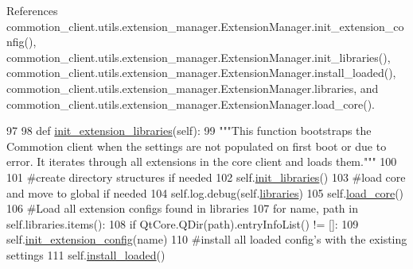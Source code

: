 References commotion\+\_\+client.\+utils.\+extension\+\_\+manager.\+Extension\+Manager.\+init\+\_\+extension\+\_\+config(), commotion\+\_\+client.\+utils.\+extension\+\_\+manager.\+Extension\+Manager.\+init\+\_\+libraries(), commotion\+\_\+client.\+utils.\+extension\+\_\+manager.\+Extension\+Manager.\+install\+\_\+loaded(), commotion\+\_\+client.\+utils.\+extension\+\_\+manager.\+Extension\+Manager.\+libraries, and commotion\+\_\+client.\+utils.\+extension\+\_\+manager.\+Extension\+Manager.\+load\+\_\+core().


\begin{DoxyCode}
97 
98     \textcolor{keyword}{def }\hyperlink{classcommotion__client_1_1utils_1_1extension__manager_1_1ExtensionManager_a5a94323a3528a6af3bf009eb302fa729}{init\_extension\_libraries}(self):
99         \textcolor{stringliteral}{"""This function bootstraps the Commotion client when the settings are not populated on first boot
       or due to error. It iterates through all extensions in the core client and loads them."""}
100         
101         \textcolor{comment}{#create directory structures if needed}
102         self.\hyperlink{classcommotion__client_1_1utils_1_1extension__manager_1_1ExtensionManager_a2edb9c39e0b8e5143c245089170182a3}{init\_libraries}()
103         \textcolor{comment}{#load core and move to global if needed}
104         self.log.debug(self.\hyperlink{classcommotion__client_1_1utils_1_1extension__manager_1_1ExtensionManager_a28e035496b4d544179f934b3c401c0c1}{libraries})
105         self.\hyperlink{classcommotion__client_1_1utils_1_1extension__manager_1_1ExtensionManager_a98f5f3c261f083885a9b0528dcdafd34}{load\_core}()
106         \textcolor{comment}{#Load all extension configs found in libraries}
107         \textcolor{keywordflow}{for} name, path \textcolor{keywordflow}{in} self.libraries.items():
108             \textcolor{keywordflow}{if} QtCore.QDir(path).entryInfoList() != []:
109                 self.\hyperlink{classcommotion__client_1_1utils_1_1extension__manager_1_1ExtensionManager_ae751a1b407e33af012d41ec44f2ce717}{init\_extension\_config}(name)
110         \textcolor{comment}{#install all loaded config's with the existing settings}
111         self.\hyperlink{classcommotion__client_1_1utils_1_1extension__manager_1_1ExtensionManager_a58bcb83cefe458d4affcb185785694c6}{install\_loaded}()

\end{DoxyCode}
